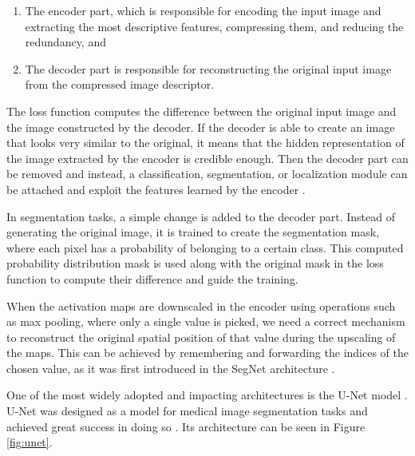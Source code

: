 \begin{enumerate}
    \item The encoder part, which is responsible for encoding the input image and extracting the most descriptive features, compressing them, and reducing the redundancy, and
    \item The decoder part is responsible for reconstructing the original input image from the compressed image descriptor.
\end{enumerate}

The loss function computes the difference between the original input image and the image constructed by the decoder. If the decoder is able to create an image that looks very similar to the original, it means that the hidden representation of the image extracted by the encoder is credible enough. Then the decoder part can be removed and instead, a classification, segmentation, or localization module can be attached and exploit the features learned by the encoder \cite{Santosh2022-2}.

In segmentation tasks, a simple change is added to the decoder part. Instead of generating the original image, it is trained to create the segmentation mask, where each pixel has a probability of belonging to a certain class. This computed probability distribution mask is used along with the original mask in the loss function to compute their difference and guide the training.

When the activation maps are downscaled in the encoder using operations such as max pooling, where only a single value is picked, we need a correct mechanism to reconstruct the original spatial position of that value during the upscaling of the maps. This can be achieved by remembering and forwarding the indices of the chosen value, as it was first introduced in the SegNet architecture \cite{Badrinarayanan2017}.

One of the most widely adopted and impacting architectures is the U-Net model \cite{Ronneberger2015}. U-Net was designed as a model for medical image segmentation tasks and achieved great success in doing so \cite{Santosh2022-3, Siddique2021}. Its architecture can be seen in Figure \ref{fig:unet}.

